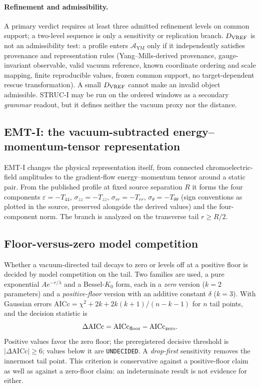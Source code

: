 \documentclass[11pt,a4paper]{article}
\theoremstyle{definition}
\theoremstyle{remark}
\newcommand{\AYM}{\mathcal{A}_{\mathrm{YM}}}
\begin{document}
\paragraph{Refinement and admissibility.} A primary verdict requires at least three admitted refinement levels on common support; a two-level sequence is only a sensitivity or replication branch. $D_{\rm VREF}$ is not an admissibility test: a profile enters $\AYM$ only if it independently satisfies provenance and representation rules (Yang--Mills-derived provenance, gauge-invariant observable, valid vacuum reference, known coordinate ordering and scale mapping, finite reproducible values, frozen common support, no target-dependent rescue transformation). A small $D_{\rm VREF}$ cannot make an invalid object admissible. STRUC-I may be run on the ordered windows as a secondary \emph{grammar} readout, but it defines neither the vacuum proxy nor the distance.

\subsection{EMT-I: the vacuum-subtracted energy--momentum-tensor representation}\label{ssec:emti}
EMT-I changes the physical representation itself, from connected chromoelectric-field amplitudes to the gradient-flow energy--momentum tensor around a static pair. From the published profile at fixed source separation $R$ it forms the four components $\varepsilon=-T_{44}$, $\sigma_{zz}=-T_{zz}$, $\sigma_{rr}=-T_{rr}$, $\sigma_\theta=-T_{\theta\theta}$ (sign conventions as plotted in the source, preserved alongside the derived values) and the four-component norm. The branch is analyzed on the transverse tail $r\ge R/2$.

\subsection{Floor-versus-zero model competition}\label{ssec:aicc}
Whether a vacuum-directed tail decays to zero or levels off at a positive floor is decided by model competition on the tail. Two families are used, a pure exponential $Ae^{-r/\lambda}$ and a Bessel-$K_0$ form, each in a \emph{zero} version ($k=2$ parameters) and a \emph{positive-floor} version with an additive constant $\delta$ ($k=3$). With Gaussian errors $\mathrm{AICc}=\chi^2+2k+2k(k+1)/(n-k-1)$ for $n$ tail points, and the decision statistic is
\begin{equation}
\Delta\mathrm{AICc}=\mathrm{AICc}_{\rm floor}-\mathrm{AICc}_{\rm zero}.
\end{equation}
Positive values favor the zero floor; the preregistered decisive threshold is $|\Delta\mathrm{AICc}|\ge6$; values below it are \texttt{UNDECIDED}. A \emph{drop-first} sensitivity removes the innermost tail point. This criterion is conservative against a positive-floor claim as well as against a zero-floor claim: an indeterminate result is not evidence for either.
\end{document}

